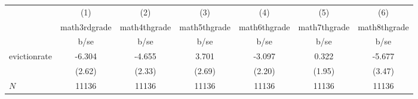 {
\def\sym#1{\ifmmode^{#1}\else\(^{#1}\)\fi}
\begin{tabular}{l*{6}{c}}
\hline\hline
            &\multicolumn{1}{c}{(1)}  &\multicolumn{1}{c}{(2)}  &\multicolumn{1}{c}{(3)}  &\multicolumn{1}{c}{(4)}  &\multicolumn{1}{c}{(5)}  &\multicolumn{1}{c}{(6)}  \\
            &\multicolumn{1}{c}{math3rdgrade}&\multicolumn{1}{c}{math4thgrade}&\multicolumn{1}{c}{math5thgrade}&\multicolumn{1}{c}{math6thgrade}&\multicolumn{1}{c}{math7thgrade}&\multicolumn{1}{c}{math8thgrade}\\
            &                     b/se&                     b/se&                     b/se&                     b/se&                     b/se&                     b/se\\
\hline
evictionrate&                   -6.304&                   -4.655&                    3.701&                   -3.097&                    0.322&                   -5.677\\
            &                   (2.62)&                   (2.33)&                   (2.69)&                   (2.20)&                   (1.95)&                   (3.47)\\
\hline
\(N\)       &                    11136&                    11136&                    11136&                    11136&                    11136&                    11136\\
\hline\hline
\end{tabular}
}
